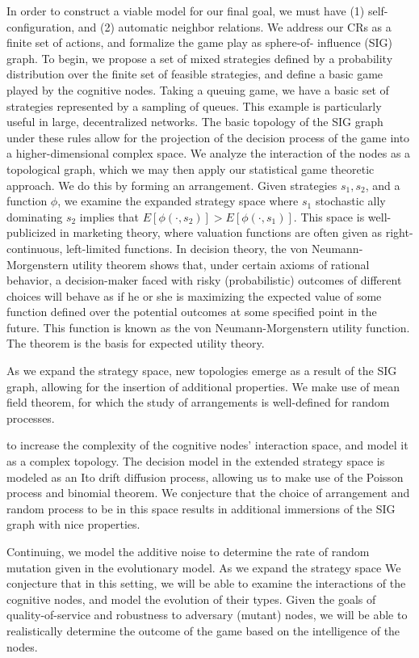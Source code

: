 \documentclass[10pt]{article}
\theoremstyle{definition}
\begin{document}
In order to construct a
viable model for our final goal, we must have (1) self-configuration, and (2) automatic neighbor
relations. We address our CRs as a finite set of actions, and formalize the game play as sphere-of-
influence (SIG) graph. To begin, we propose a set of mixed strategies defined by a probability
distribution over the finite set of feasible strategies, and define a basic game played by the
cognitive nodes.
Taking a queuing game, we have a basic set of strategies represented by a sampling of queues. This example is particularly useful in large, decentralized networks. The basic topology of the SIG graph under these rules allow for the projection of the decision process of the game into a higher-dimensional complex space. We analyze the interaction of the nodes as a topological graph, which we may then apply our statistical game theoretic approach. We do this by forming an arrangement. Given strategies $s_1, s_2$, and a function $\phi$, we examine the expanded strategy space where $s_1$ stochastic ally dominating $s_2$ implies that $E[\phi (\cdot, s_2 )] > E[\phi (\cdot, s_1 )]$. This space is well-publicized in marketing theory, where valuation functions are often given as right-continuous, left-limited functions. In decision theory, the von Neumann-Morgenstern utility theorem shows that, under certain axioms of rational behavior, a decision-maker faced with risky (probabilistic) outcomes of different choices will behave as if he or she is maximizing the expected value of some function defined over the potential outcomes at some specified point in the future. This function is known as the von Neumann-Morgenstern utility function. The theorem is the basis for expected utility theory.

As we expand the strategy space, new topologies emerge as a result of the SIG graph, allowing for the insertion of additional properties. We make use of mean field theorem, for which the study of arrangements is well-defined for random processes.

 to increase the complexity of the cognitive nodes' interaction space, and model it as a complex topology. 
The decision model in the extended strategy space is modeled as an Ito drift diffusion process, allowing us to make use of the Poisson process and binomial theorem. We conjecture that the choice of arrangement and random process to be in this space results in additional immersions of the SIG graph with nice properties.

Continuing, we model the additive noise to determine the rate of random mutation given in the evolutionary model. As we expand the strategy space
We conjecture that in this setting, we will be able to examine the interactions of the cognitive nodes, and model the evolution of their types. Given the goals of quality-of-service and robustness to adversary (mutant) nodes, we will be able to realistically determine the outcome of the game based on the intelligence of the nodes.
\end{document}
